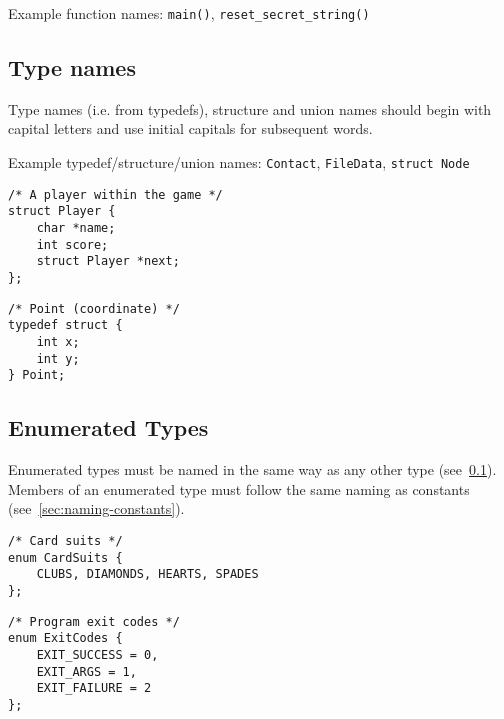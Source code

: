 \documentclass{article}
\begin{document}
Example function names: \texttt{main()}, \texttt{reset\_secret\_string()}

\subsection{Type names}
\label{sec:type-names}
Type names (i.e. from typedefs), structure and union names should begin with capital letters and use initial capitals for subsequent words.

Example typedef/structure/union names: \texttt{Contact}, \texttt{FileData}, \texttt{struct Node}

\begin{multicols}{2}
\begin{lstlisting}
/* A player within the game */
struct Player {
    char *name;
    int score;
    struct Player *next;
};
\end{lstlisting}
\vfill
\columnbreak

\begin{lstlisting}
/* Point (coordinate) */
typedef struct {
    int x;
    int y;
} Point;
\end{lstlisting}
\end{multicols}

\clearpage
\subsection{Enumerated Types}
Enumerated types must be named in the same way as any other type (see~\ref{sec:type-names}).
Members of an enumerated type must follow the same naming as constants (see~\ref{sec:naming-constants}).

\begin{multicols}{2}
\begin{lstlisting}
/* Card suits */
enum CardSuits {
    CLUBS, DIAMONDS, HEARTS, SPADES
};
\end{lstlisting}
\vfill
\columnbreak

\begin{lstlisting}
/* Program exit codes */
enum ExitCodes {
    EXIT_SUCCESS = 0,
    EXIT_ARGS = 1,
    EXIT_FAILURE = 2
};
\end{lstlisting}
\end{multicols}
\end{document}
